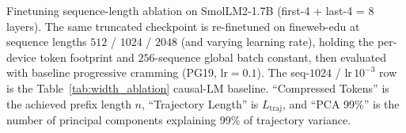 \begin{table}[t]
    \centering
    \caption{Finetuning sequence-length ablation on SmolLM2-1.7B (first-4 + last-4 = 8 layers). The same truncated checkpoint is re-finetuned on fineweb-edu at sequence lengths $512$ / $1024$ / $2048$ (and varying learning rate), holding the per-device token footprint and $256$-sequence global batch constant, then evaluated with baseline progressive cramming (PG19, $\mathrm{lr}=0.1$). The seq-$1024$ / $\mathrm{lr}\,10^{-3}$ row is the Table~\ref{tab:width_ablation} causal-LM baseline. ``Compressed Tokens'' is the achieved prefix length $n$, ``Trajectory Length'' is $L_{\text{traj}}$, and ``PCA 99\%'' is the number of principal components explaining 99\% of trajectory variance.}
    \label{tab:finetune_seqlen_ablation}
    \begin{small}
    
    \end{small}
\vskip -0.1in
\end{table}


